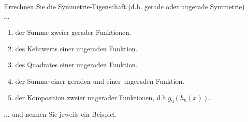 \begin{ExerciseBlock}
Errechnen Sie die Symmetrie-Eigenschaft (d.h. gerade oder ungerade Symmetrie) ... 
\begin{enumerate}[label=\alph*)]
\item der Summe zweier gerader Funktionen.
\item des Kehrwerts einer ungeraden Funktion.
\item des Quadrates einer ungeraden Funktion.
\item der Summe einer geraden und einer ungeraden Funktion.
\item der Komposition zweier ungerader Funktionen, d.h.$g_\text{u}\left( h_\text{u}\left( x \right) \right)$.
\end{enumerate}
... und nennen Sie jeweils ein Beispiel.

\end{ExerciseBlock}
